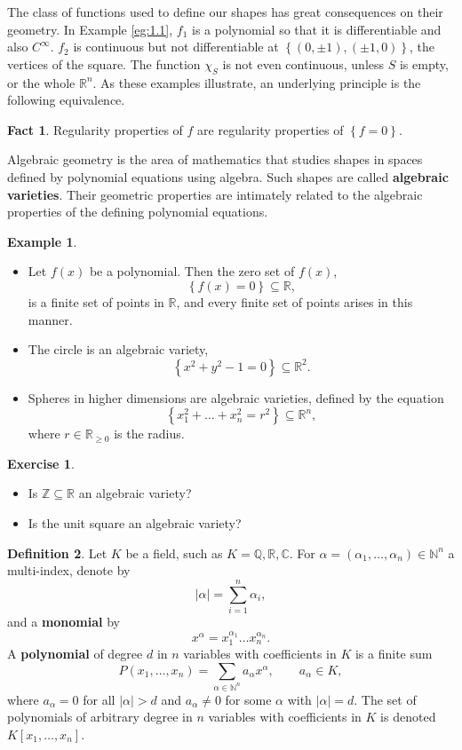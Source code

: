 \documentclass{article}
\newcommand{\N}{\mathbb{N}}
\newcommand{\Z}{\mathbb{Z}}
\newcommand{\Q}{\mathbb{Q}}
\newcommand{\R}{\mathbb{R}}
\newcommand{\C}{\mathbb{C}}
\newcommand{\rb}[1]{\left( #1 \right)}
\renewcommand{\sb}[1]{\left[ #1 \right]}
\newcommand{\cb}[1]{\left\{ #1 \right\}}
\newcommand{\abs}[1]{\left\lvert #1 \right\rvert}
\theoremstyle{definition}\newtheorem{definition}{Definition}[section]
\theoremstyle{definition}\newtheorem{notation}[definition]{Notation}
\theoremstyle{definition}\newtheorem{remark}[definition]{Remark}
\theoremstyle{definition}\newtheorem{example1}[definition]{Example}
\theoremstyle{definition}\newtheorem{fact}{Fact}
\theoremstyle{definition}\newtheorem{exercise}{Exercise}
\theoremstyle{definition}\newtheorem*{example2}{Example}
\begin{document}
The class of functions used to define our shapes has great consequences on their geometry. In Example \ref{eg:1.1}, $ f_1 $ is a polynomial so that it is differentiable and also $ C^\infty $. $ f_2 $ is continuous but not differentiable at $ \cb{\rb{0, \pm 1}, \rb{\pm 1, 0}} $, the vertices of the square. The function $ \chi_S $ is not even continuous, unless $ S $ is empty, or the whole $ \R^n $. As these examples illustrate, an underlying principle is the following equivalence.

\begin{fact}
Regularity properties of $ f $ are regularity properties of $ \cb{f = 0} $.
\end{fact}

Algebraic geometry is the area of mathematics that studies shapes in spaces defined by polynomial equations using algebra. Such shapes are called \textbf{algebraic varieties}. Their geometric properties are intimately related to the algebraic properties of the defining polynomial equations.

\begin{example1}
\hfill
\begin{itemize}
\item Let $ f\rb{x} $ be a polynomial. Then the zero set of $ f\rb{x} $,
$$ \cb{f\rb{x} = 0} \subseteq \R, $$
is a finite set of points in $ \R $, and every finite set of points arises in this manner.
\item The circle is an algebraic variety,
$$ \cb{x^2 + y^2 - 1 = 0} \subseteq \R^2. $$
\item Spheres in higher dimensions are algebraic varieties, defined by the equation
$$ \cb{x_1^2 + \dots + x_n^2 = r^2} \subseteq \R^n, $$
where $ r \in \R_{\ge 0} $ is the radius.
\end{itemize}
\end{example1}

\begin{exercise}
\hfill
\begin{itemize}
\item Is $ \Z \subseteq \R $ an algebraic variety?
\item Is the unit square an algebraic variety?
\end{itemize}
\end{exercise}

\begin{definition}
Let $ K $ be a field, such as $ K = \Q, \R, \C $. For $ \alpha = \rb{\alpha_1, \dots, \alpha_n} \in \N^n $ a multi-index, denote by
$$ \abs{\alpha} = \sum_{i = 1}^n \alpha_i, $$
and a \textbf{monomial} by
$$ x^\alpha = x_1^{\alpha_1} \dots x_n^{\alpha_n}. $$
A \textbf{polynomial} of degree $ d $ in $ n $ variables with coefficients in $ K $ is a finite sum
$$ P\rb{x_1, \dots, x_n} = \sum_{\alpha \in \N^n} a_\alpha x^\alpha, \qquad a_\alpha \in K, $$
where $ a_\alpha = 0 $ for all $ \abs{\alpha} > d $ and $ a_\alpha \ne 0 $ for some $ \alpha $ with $ \abs{\alpha} = d $. The set of polynomials of arbitrary degree in $ n $ variables with coefficients in $ K $ is denoted $ K\sb{x_1, \dots, x_n} $.
\end{definition}
\end{document}
